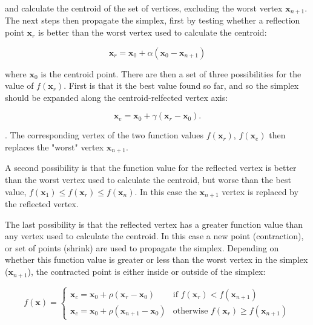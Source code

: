 and calculate the centroid of the set of vertices, excluding the worst vertex 
$\mathbf{x}_{n+1}$. The next steps then propagate the simplex, first by testing 
whether a reflection point $\mathbf{x}_r$ is better than the worst vertex used to
calculate the centroid:

\begin{equation}
\mathbf{x}_r = \mathbf{x}_0 + \alpha\left(\mathbf{x}_0 - \mathbf{x}_{n+1}\right) 
\end{equation}

where $\mathbf{x}_0$ is the centroid point. There are then a set of three possibilities
for the value of $f\left(\mathbf{x}_r\right)$. First is that it the best value
found so far, and so the simplex should be expanded along the centroid-relfected 
vertex axis:

\begin{equation}
\mathbf{x}_e = \mathbf{x}_0 + \gamma\left(\mathbf{x}_r - \mathbf{x}_0 \right).
\end{equation}

. The corresponding vertex of the two function values $f\left(\mathbf{x}_r\right)$, 
$f\left(\mathbf{x}_e\right)$ then replaces the "worst" vertex $\mathbf{x}_{n+1}$.

A second possibility is that the function value for the reflected vertex is better
than the worst vertex used to calculate the centroid, but worse than the best 
value, $f\left(\mathbf{x}_1\right) \leq f\left(\mathbf{x}_r\right) \leq f\left(\mathbf{x}_n\right)$.
In this case the $\mathbf{x}_{n+1}$ vertex is replaced by the reflected vertex.

The last possibility is that the reflected vertex has a greater function value than
any vertex used to calculate the centroid. In this case a new point (contraction),
or set of points (shrink) are used to propagate the simplex. Depending on whether
this function value is greater or less than the worst vertex in the simplex ($\mathbf{x}_{n+1}$),
the contracted point is either inside or outside of the simplex:

\begin{equation}
    f\left(\mathbf{x}\right)= 
    \begin{cases}
    \mathbf{x}_c = \mathbf{x}_0 + \rho \left(\mathbf{x}_r - \mathbf{x}_0 \right)               & \text{if } f\left(\mathbf{x}_r\right) < f\left(\mathbf{x}_{n+1}\right)\\
    \mathbf{x}_c = \mathbf{x}_0 + \rho \left(\mathbf{x}_{n+1} - \mathbf{x}_0 \right)           & \text{otherwise } f\left(\mathbf{x}_r\right) \geq f\left(\mathbf{x}_{n+1}\right)
    \end{cases}
\end{equation}

